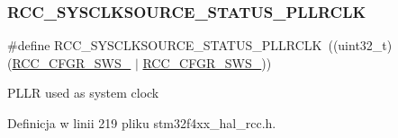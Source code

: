 \subsubsection{\texorpdfstring{R\+C\+C\+\_\+\+S\+Y\+S\+C\+L\+K\+S\+O\+U\+R\+C\+E\+\_\+\+S\+T\+A\+T\+U\+S\+\_\+\+P\+L\+L\+R\+C\+LK}{RCC\_SYSCLKSOURCE\_STATUS\_PLLRCLK}}
{\footnotesize\ttfamily \#define R\+C\+C\+\_\+\+S\+Y\+S\+C\+L\+K\+S\+O\+U\+R\+C\+E\+\_\+\+S\+T\+A\+T\+U\+S\+\_\+\+P\+L\+L\+R\+C\+LK~((uint32\+\_\+t)(\hyperlink{group___peripheral___registers___bits___definition_ga1eae59112c51def51979e31e8695b39f}{R\+C\+C\+\_\+\+C\+F\+G\+R\+\_\+\+S\+W\+S\+\_} $\vert$ \hyperlink{group___peripheral___registers___bits___definition_gaad3a5718999d7259f216137a23c2a379}{R\+C\+C\+\_\+\+C\+F\+G\+R\+\_\+\+S\+W\+S\+\_}))}

P\+L\+LR used as system clock 

Definicja w linii 219 pliku stm32f4xx\+\_\+hal\+\_\+rcc.\+h.

